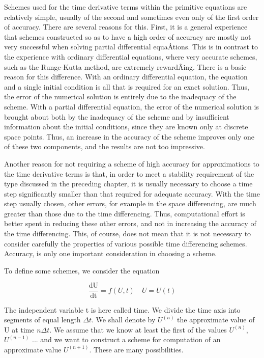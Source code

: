 Schemes used for the time derivative terms within the primitive
equations are relatively simple, usually of the second and sometimes
even only of the first order of accuracy. There are several reasons for
this. First, it is a\textquotesingle{} general experience that schemes
constructed so as to have a high order of accuracy are mostly not very
successful when solving partial differential equaÂ­tions. This is in
contrast to the experience with ordinary differential equations, where
very accurate schemes, such as the Runge-Kutta method, are extremely
rewardÂ­ing. There is a basic reason for this difference. With an
ordinary differential equation, the equation and a single initial
condition is all that is required for an exact solution. Thus, the error
of the numerical solution is entirely due to the inadequacy of the
scheme. With a partial differential equation, the error of the numerical
solution is brought about both by the inadequacy of the scheme and by
insufficient information about the initial conditions, since they are
known only at discrete space points. Thus, an increase in the accuracy
of the scheme improves only one of these two components, and the results
are not too impressive.

Another reason for not requiring a scheme of high accuracy for
approximations to the time derivative terms is that, in order to meet a
stability requirement of the type discussed in the preceding chapter, it
is usually necessary to choose a time step significantly smaller than
that required for adequate accuracy. With the time step usually chosen,
other errors, for example in the space differencing, are much greater
than those due to the time differencing. Thus, computational effort is
better spent in reducing these other errors, and not in increasing the
accuracy of the time differencing. This, of course, does not mean that
it is not necessary to consider carefully the properties of various
possible time differencing schemes. Accuracy, is only one important
consideration in choosing a scheme.

To define some schemes, we consider the equation

{\[\frac{\text{dU}}{\text{dt}} = f( U,t) \quad  U = U(t)\]}

The independent variable t is here called time. We divide the time axis
into segments of equal length \(\Delta t\). We shall denote by
\(U^{\left( n \right)}\) the approximate value of U at time
\(n\Delta t\). We assume that we know at least the first of the values
\(U^{\left( n \right)}\), \(U^{\left( n - 1 \right)}\) ... and we want
to construct a scheme for computation of an approximate value
\(U^{\left( n + 1 \right)}\). These are many possibilities.

